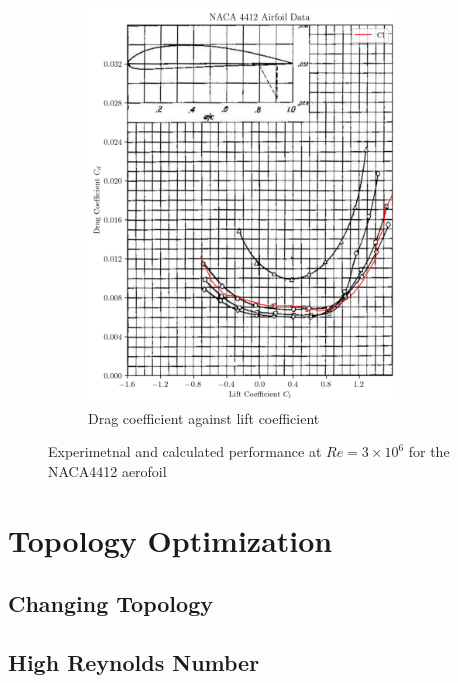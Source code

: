 \documentclass{article}
\begin{document}
\begin{figure}[H]
\begin{subfigure}{0.45\textwidth}
        \includegraphics[width=0.9\textwidth]{figures/NACA4412_drag_validation.png}
        \caption{Drag coefficient against lift coefficient}
        \label{fig:4412_drag_validation}
    \end{subfigure}
    \caption{Experimetnal and calculated performance at $Re = 3\times10^6$ for the NACA4412 aerofoil}
\end{figure}

\section{Topology Optimization}

\subsection{Changing Topology}

\subsection{High Reynolds Number}
\end{document}
